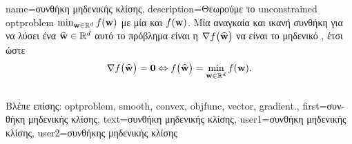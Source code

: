 {name={\foreignlanguage{greek}{συνθήκη μηδενικής κλίσης}},
	description={\foreignlanguage{greek}{Θεωρούμε το}  unconstrained 
		\gls{optproblem} $\min_{{\bf w} \in \mathbb{R}^{d}} f({\bf w})$ \foreignlanguage{greek}{με μία} 
		 \foreignlanguage{greek}{και}   $f({\bf w})$. 
		\foreignlanguage{greek}{Μία αναγκαία και ικανή συνθήκη για να λύσει ένα}  $\widehat{{\bf w}} \in \mathbb{R}^{d}$ 
		\foreignlanguage{greek}{αυτό το πρόβλημα είναι η}  $\nabla f \big( \widehat{{\bf w}} \big)$ 
		\foreignlanguage{greek}{να είναι το μηδενικό} , \foreignlanguage{greek}{έτσι ώστε} 
		$$\nabla f \big( \widehat{{\bf w}} \big) = \mathbf{0} \Leftrightarrow  f \big( \widehat{{\bf w}} \big) = \min_{{\bf w} \in \mathbb{R}^{d}} f({\bf w}).$$\\
		\foreignlanguage{greek}{Βλέπε επίσης:} \gls{optproblem}, \gls{smooth}, \gls{convex}, \gls{objfunc}, \gls{vector}, \gls{gradient}.}, 
	first={\foreignlanguage{greek}{συνθήκη μηδενικής κλίσης}},
	text={\foreignlanguage{greek}{συνθήκη μηδενικής κλίσης}},
	user1={\foreignlanguage{greek}{συνθήκη μηδενικής κλίσης}}, %
	user2={\foreignlanguage{greek}{συνθήκης μηδενικής κλίσης}} %
}

